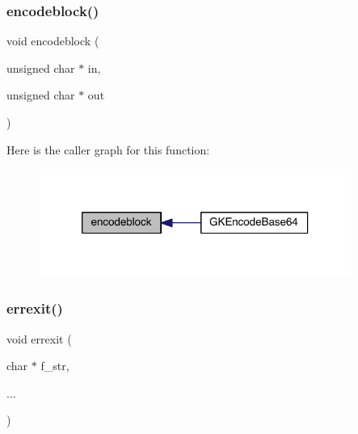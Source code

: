 \subsubsection{\texorpdfstring{encodeblock()}{encodeblock()}}
{\footnotesize\ttfamily void encodeblock (\begin{DoxyParamCaption}\item[{unsigned char $\ast$}]{in,  }\item[{unsigned char $\ast$}]{out }\end{DoxyParamCaption})}

Here is the caller graph for this function\+:\nopagebreak
\begin{figure}[H]
\begin{center}
\leavevmode
\includegraphics[width=290pt]{a00077_a9196de4bd8fefa1d09e0d4a273dedde5_icgraph}
\end{center}
\end{figure}
\mbox{\label{a00077_a219ed447289ea84042889361cf7e5dc5}} 
\subsubsection{\texorpdfstring{errexit()}{errexit()}}
{\footnotesize\ttfamily void errexit (\begin{DoxyParamCaption}\item[{char $\ast$}]{f\+\_\+str,  }\item[{}]{... }\end{DoxyParamCaption})}

